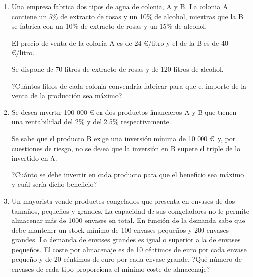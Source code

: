 \begin{adjustwidth}{20pt}{10pt}
\begin{enumerate}[PB. 1. ]
\item Una empresa fabrica dos tipos de agua de colonia, A y B.
 La colonia A contiene un 5\% de extracto de rosas y un 10\% de alcohol, mientras que la B se fabrica con un 10\% de extracto de rosas y un 15\% de alcohol.
 
El precio de venta de la colonia A es de 24 \euro/litro y el de la B es de 40 \euro/litro.

Se dispone de 70 litros de extracto de rosas y de 120 litros de alcohol.

?Cuántos litros de cada colonia convendría fabricar para que el importe de la venta de la producción sea máximo?

\hspace{-15mm}\vspace{1cm}




\item  Se desea invertir 100 000 € en dos productos financieros A y B que tienen una
 rentabilidad del 2\% y del 2.5\% respectivamente.

Se sabe que el producto B exige una inversión mínima de 10 000 \euro $\,$ y, por cuestiones de riesgo, no se desea que la inversión en B supere el triple de lo invertido en A.

?Cuánto se debe invertir en cada producto para que el beneficio sea máximo y cuál sería dicho beneficio?

\hspace{-15mm}\vspace{1cm}




\item Un mayorista vende productos congelados que presenta en envases de dos tamaños, pequeños y grandes. La capacidad de sus congeladores no le permite almacenar más de 1000 envases en total. En función de la demanda sabe que debe mantener un stock mínimo de 100 envases pequeños y 200 envases grandes. La demanda de envases grandes es igual o superior a la de envases pequeños. El coste por almacenaje es de 10 céntimos de euro por cada envase pequeño y de 20 céntimos de euro por cada envase grande. ?Qué número de envases de cada tipo proporciona el mínimo coste de almacenaje?


\end{enumerate}
\end{adjustwidth}
